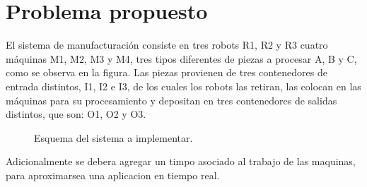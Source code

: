 \documentclass[10pt, a4paper,notitlepage]{article}
\begin{document}
\section{Problema propuesto}
El sistema de manufacturación consiste en tres robots R1, R2 y R3 cuatro máquinas M1, M2, M3 y M4, tres tipos diferentes de piezas a procesar A, B y C, como se observa en la figura.
Las piezas provienen de tres contenedores de entrada distintos, I1, I2 e I3, de los cuales los robots las retiran, las colocan en las máquinas para su procesamiento y depositan en tres contenedores de salidas distintos, que son: O1, O2 y O3.

\begin{figure}[H] %
	\caption{Esquema del sistema a implementar.}
	\label{fig:I1}
\end{figure}

Adicionalmente se debera agregar un timpo asociado al trabajo de las maquinas, para aproximarsea una aplicacion en tiempo real.
\end{document}
